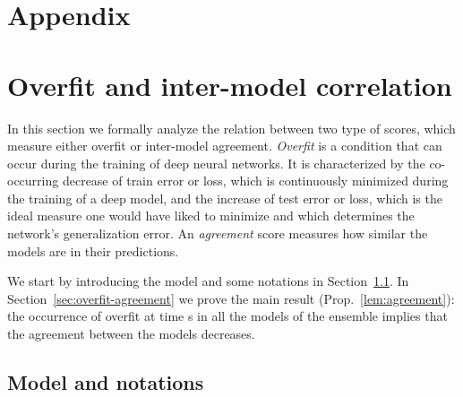 \documentclass{article}
\begin{document}



\clearpage
\appendix

\section*{Appendix}


\section{Overfit and inter-model correlation}
\label{sec:overfit-app}

In this section we formally analyze the relation between two type of scores, which  measure either overfit or inter-model agreement. \emph{Overfit} is a condition that can occur during the training of deep neural networks. It is characterized by the co-occurring decrease of train error or loss, which is continuously minimized during the training of a deep model, and the increase of test error or loss, which is the ideal measure one would have liked to minimize and which determines the network's generalization error. An \emph{agreement} score measures how similar the models are in their predictions. 

We start by introducing the model and some notations in Section~\ref{sec:notations}.  In Section~\ref{sec:overfit-agreement} we prove the main result (Prop.~\ref{lem:agreement}): the occurrence of overfit at time s in all the models of the ensemble implies that the agreement
between the models decreases.


\subsection{Model and notations}
\label{sec:notations}
\end{document}
